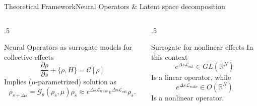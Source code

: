 \documentclass[aspectratio=169,t,11pt,table]{beamer}
{\setbeamercovered{transparent}}
\begin{document}
\begin{frame}{Theoretical Framework}{Neural Operators \& Latent space decomposition}
  \vspace{-1cm}
  \begin{columns}[T]
    \begin{column}{.5\textwidth}
      \begin{purpleBlock}{\centering\small{Neural Operators as surrogate models for collective effects}}
        \[
          \frac{\partial \rho}{\partial s} + \{\rho,H\} = \mathcal{C}[\rho]
        \]
        Implies ($\mu$-parametrized) solution as 
        \[
            \rho_{s+\Delta s}=\mathcal{G}_\theta(\rho_s,\mu)\rho_s \approx e^{\Delta s \mathcal{L}_ {\mathrm{wake}}} e^{\Delta s \mathcal{L}_{\mathrm{ext}}}\rho_s.
        \]
        
      \end{purpleBlock}
         \end{column}
    \hfill
    \begin{column}{.5\textwidth}
      \begin{purpleBlock}{\centering\small{Surrogate for nonlinear effects}}
        \vspace{-0.2cm}
        \small
        In this context 
        \[
        e^{\Delta s \mathcal{L}_{\mathrm{ext}}}\in GL(\mathbb{R}^{N})   
        \]
        Is a linear operator, while
        \[
        e^{\Delta s \mathcal{L}_{\mathrm{wake}}}\in O(\mathbb{R}^{N})   
        \]
        Is a nonlinear operator. 
      \end{purpleBlock}
    \end{column}
  \end{columns}
 	
  
  \bottomleft{
  }
\end{frame}
\end{document}
